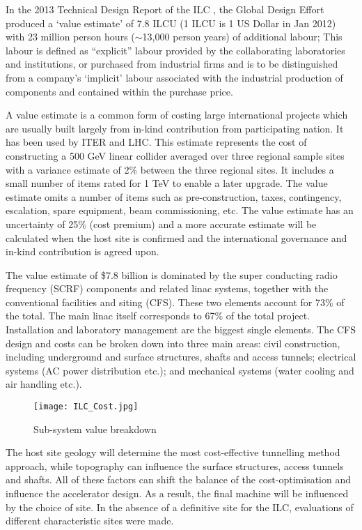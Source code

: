 In the 2013 Technical Design Report of the ILC \cite{ILC:TechnicalDesignReport}, the Global Design Effort produced a `value estimate' of 7.8 ILCU (1 ILCU is 1 US Dollar in Jan 2012) with 23 million person hours ($\sim$13,000 person years) of additional labour; This labour is defined as “explicit” labour provided by the collaborating laboratories and institutions, or purchased from industrial firms and is to be distinguished from a company's `implicit' labour associated with the industrial production of components and contained within the purchase price.  
 
A value estimate is a common form of costing large international projects which are usually built largely from in-kind contribution from participating nation. It has been used by ITER and LHC. This estimate represents the cost of constructing a 500 GeV linear collider averaged over three regional sample sites \textendash with a variance estimate of 2\% between the three regional sites. It includes a small number of items rated for 1 TeV to enable a later upgrade. The value estimate omits a number of items such as pre-construction, taxes, contingency, escalation, spare equipment, beam commissioning, etc. The value estimate has an uncertainty of 25\% (cost premium) and a more accurate estimate will be calculated when the host site is confirmed and the international governance and in-kind contribution is agreed upon.
 
The value estimate of \$7.8 billion is dominated by the super conducting radio frequency (SCRF) components and related linac systems, together with the conventional facilities and siting (CFS). These two elements account for 73\% of the total. The main linac itself corresponds to 67\% of the total project. Installation and laboratory management are the biggest single elements. The CFS design and costs can be broken down into three main areas: civil construction, including underground and surface structures, shafts and access tunnels; electrical systems (AC power distribution etc.); and mechanical systems (water cooling and air handling etc.).
 
\begin{figure}[!htb]
\centering
\texttt{[image: ILC\_Cost.jpg]}
\caption{Sub-system value breakdown \cite{ILC:TechnicalDesignReport}}
\end{figure}
 
The host site geology will determine the most cost-effective tunnelling method approach, while topography can influence the surface structures, access tunnels and shafts. All of these factors can shift the balance of the cost-optimisation and influence the accelerator design. As a result, the final machine will be influenced by the choice of site. In the absence of a definitive site for the ILC, evaluations of different characteristic sites were made. \cite{ILC:TechnicalDesignReport}
 
